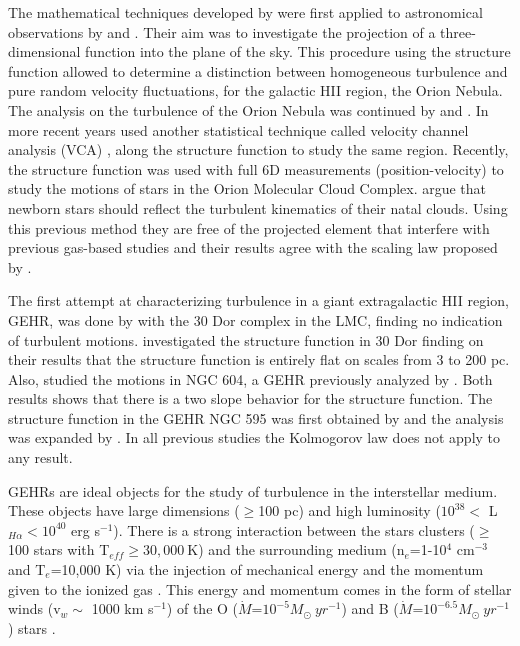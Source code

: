 \documentclass[fleqn,usenatbib]{mnras}
\begin{document}
The mathematical techniques developed by \citet{kolm1,heisenberg1951stability} were first applied to astronomical observations by \citet{von1951methode} and \citet{munch1958internal}. Their aim was to investigate the projection of a three-dimensional function into the plane of the sky. This procedure using the structure function allowed to determine a distinction between homogeneous turbulence and pure random velocity fluctuations, for the galactic HII region, the Orion Nebula. The analysis on the turbulence of the Orion Nebula was continued by \citet{castaneda1988} and \citet{1992ApJ...387..229O}. In more recent years \cite{arthur2016turbulence} used another statistical technique called velocity channel analysis (VCA) \citep{2000ApJ...537..720L}, along the structure function to study the same region. Recently, the structure function was used with full 6D measurements (position-velocity) to study the motions of stars in the Orion Molecular Cloud Complex. \cite{2021ApJ...907L..40H} argue that newborn stars should reflect the turbulent kinematics of their natal clouds. Using this previous method they are free of the projected element that interfere with previous gas-based studies and their results agree with the scaling law proposed by \cite{1981MNRAS.194..809L}.  

The first attempt at characterizing turbulence in a giant extragalactic HII region, GEHR, was done by \citet{1961MNRAS.122....1F} with the 30 Dor complex in the LMC, finding no indication of turbulent motions. \cite{2019arXiv191203543M} investigated the structure function in 30 Dor finding on their results that the structure function is entirely flat on scales from 3 to 200 pc. Also, \cite{2019arXiv191203543M} studied the motions in NGC 604, a GEHR previously analyzed by \cite{tanco1997}. Both results shows that there is a two slope behavior for the structure function. The structure function in the GEHR NGC 595 was first obtained by \cite{lagrois2009multi} and the analysis was expanded by \cite{lagrois2011}. In all previous studies the Kolmogorov law does not apply to any result.

GEHRs are ideal objects for the study of turbulence in the interstellar medium. These objects have large dimensions ($ \geq $100 pc) and high luminosity ($10^{38}<$ L$_{H\alpha}<10^{40}$ erg s$^{-1}$). There is a strong interaction between the stars clusters ($\geq$100 stars with T$_{eff}\geq30,000\ $K) and the surrounding medium (n$_{e}$=1-10$^4$ cm$^{-3}$ and T$_{e}$=10,000 K) via the injection of mechanical energy and the momentum given to the ionized gas \citep{castaneda1992density}. This energy and momentum comes in the form of stellar winds (v$_{w}\sim$ 1000 km s$^{-1}$) of the O ($\dot{M}$=$10^{-5} M_{\odot}\ yr^{-1}$) and B ($\dot{M}$=$10^{-6.5} M_{\odot}\ yr^{-1}$) stars \citep{dyson1979}.
\end{document}

